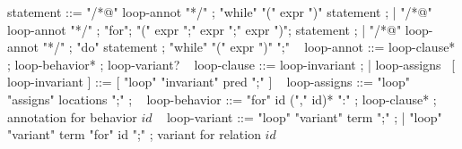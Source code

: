 \begin{syntax}
  statement ::= { "/*@" loop-annot "*/" } ;
  "while" "(" expr ")" statement ;
  | { "/*@" loop-annot "*/" } ;
    "for";
  "(" expr ";" expr ";" expr ")";
  statement ;
  | { "/*@" loop-annot "*/" } ;
  "do" statement ;
  "while" "(" expr ")" ";"
  \
  { loop-annot } ::= { loop-clause* } ;
  { loop-behavior* } ;
  { loop-variant? }
  \
  { loop-clause } ::= { loop-invariant } ;
                | { loop-assigns }
  \
  [ { loop-invariant } ] ::= [ { "loop" "invariant" pred ";" } ]
  \
  { loop-assigns } ::= { "loop" "assigns" locations ";" } ;
  \
  { loop-behavior } ::= { "for" id ("," id)* ":" } ;
  { loop-clause* } ; annotation for behavior $id$
  \
  { loop-variant } ::= { "loop" "variant" term ";" } ;
  | { "loop" "variant" term "for" id ";" } ; variant for relation $id$
\end{syntax}
